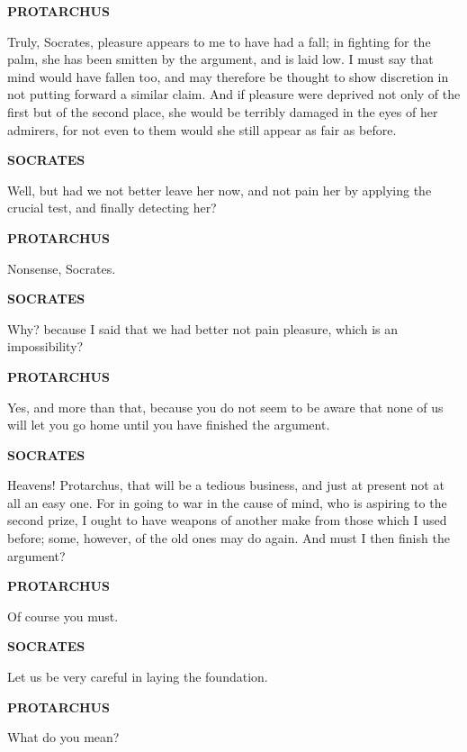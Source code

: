 \documentclass[11pt,letter]{article}
\begin{document}
\par \textbf{PROTARCHUS}
\par   Truly, Socrates, pleasure appears to me to have had a fall; in fighting for the palm, she has been smitten by the argument, and is laid low. I must say that mind would have fallen too, and may therefore be thought to show discretion in not putting forward a similar claim. And if pleasure were deprived not only of the first but of the second place, she would be terribly damaged in the eyes of her admirers, for not even to them would she still appear as fair as before.

\par \textbf{SOCRATES}
\par   Well, but had we not better leave her now, and not pain her by applying the crucial test, and finally detecting her?

\par \textbf{PROTARCHUS}
\par   Nonsense, Socrates.

\par \textbf{SOCRATES}
\par   Why? because I said that we had better not pain pleasure, which is an impossibility?

\par \textbf{PROTARCHUS}
\par   Yes, and more than that, because you do not seem to be aware that none of us will let you go home until you have finished the argument.

\par \textbf{SOCRATES}
\par   Heavens! Protarchus, that will be a tedious business, and just at present not at all an easy one. For in going to war in the cause of mind, who is aspiring to the second prize, I ought to have weapons of another make from those which I used before; some, however, of the old ones may do again. And must I then finish the argument?

\par \textbf{PROTARCHUS}
\par   Of course you must.

\par \textbf{SOCRATES}
\par   Let us be very careful in laying the foundation.

\par \textbf{PROTARCHUS}
\par   What do you mean?
\end{document}
